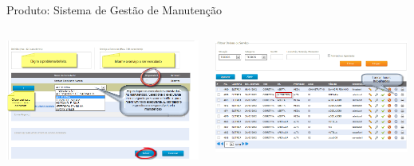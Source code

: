 \begin{frame}{Produto: Sistema de Gestão de Manutenção}
		\begin{columns}
			\begin{column}{0.45\textwidth}
				\includegraphics[width=1\textwidth]{imagens/sgm-07}
			\end{column}
			\begin{column}{0.45\textwidth}
				\includegraphics[width=1\textwidth]{imagens/sgm-08}
			\end{column}
		\end{columns}

	\framebreak
	

\end{frame}
